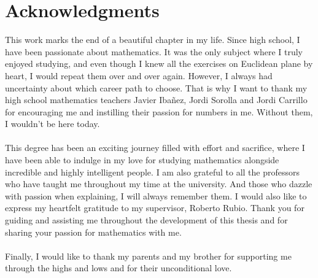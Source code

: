 \documentclass[../../main.tex]{subfiles}
\begin{document}
\section*{Acknowledgments}
\noindent This work marks the end of a beautiful chapter in my life. Since high school, I have been passionate about mathematics. It was the only subject where I truly enjoyed studying, and even though I knew all the exercises on Euclidean plane by heart, I would repeat them over and over again. However, I always had uncertainty about which career path to choose. That is why I want to thank my high school mathematics teachers Javier Ibañez, Jordi Sorolla and Jordi Carrillo for encouraging me and instilling their passion for numbers in me. Without them, I wouldn't be here today.\\ \\
\noindent This degree has been an exciting journey filled with effort and sacrifice, where I have been able to indulge in my love for studying mathematics alongside incredible and highly intelligent people. I am also grateful to all the professors who have taught me throughout my time at the university. And those who dazzle with passion when explaining, I will always remember them. I would also like to express my heartfelt gratitude to my supervisor, Roberto Rubio. Thank you for guiding and assisting me throughout the development of this thesis and for sharing your passion for mathematics with me.\\ \\
\noindent Finally, I would like to thank my parents and my brother for supporting me through the highs and lows and for their unconditional love.
\end{document}
